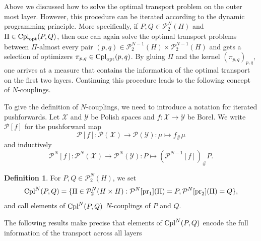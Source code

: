 \documentclass[a4paper]{amsart}
\numberwithin{theorem}{section}
\theoremstyle{definition}
\newtheorem{definition}[theorem]{Definition}
\newcommand{\Xs}{\mathcal X}
\newcommand{\Ys}{\mathcal Y}
\newcommand{\pr}{\textup{pr}}
\newcommand{\cpl}{\textup{Cpl}}
\newcommand{\Pc}{\mathcal P}
\newcommand{\cplopt}{\cpl_{\rm opt}}
\renewcommand{\H}{H}
\begin{document}
Above we discussed how to solve the optimal transport problem on the outer most layer.
However, this procedure can be iterated according to the dynamic programming principle.
More specifically, if $P,Q \in \Pc_2^N(\H)$ and $\Pi \in \cplopt(P,Q)$, then one can again solve the optimal transport problems between $\Pi$-almost every pair $(p,q) \in \Pc_2^{N-1}(H) \times \Pc_2^{N-1}(H)$ and gets a selection of optimizers $\pi_{p,q} \in \cplopt(p,q)$. By gluing $\Pi$ and the kernel $(\pi_{p,q})_{p,q}$, one arrives at a measure that contains the information of the optimal transport on the first two layers. Continuing this procedure leads to the following concept of $N$-couplings. 

To give the definition of $N$-couplings, we need to introduce a notation for iterated pushforwards. Let $\Xs$ and $\Ys$ be Polish spaces and $f : \Xs \to \Ys$ be Borel. We write $\Pc[f]$ for the pushforward map 
\[
\Pc[f] : \Pc(\Xs) \to \Pc(\Ys) : \mu \mapsto f_\#\mu
\]
and inductively
\[
\Pc^N[f] : \Pc^N(\Xs) \to \Pc^N(\Ys) : P \mapsto (\Pc^{N-1}[f])_\#P.
\]


\begin{definition}\label{def:CplN}
    For $P,Q \in \Pc_2^N(\H)$, we set 
    \[
    \cpl^N(P,Q) = \{ \Pi \in \Pc^N_2(\H \times \H) :  \Pc^N[\pr_1](\Pi) = P, \Pc^N[\pr_2](\Pi) = Q  \},
    \]
    and call elements of $\cpl^N(P,Q)$ $N$-couplings of $P$ and $Q$.
\end{definition}

The following results make precise that elements of $\cpl^N(P,Q)$ encode the full information of the transport across all layers
\end{document}
